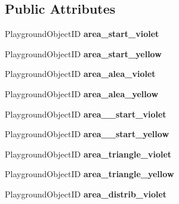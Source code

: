 \subsection*{Public Attributes}
\begin{DoxyCompactItemize}
\item 
\mbox{\label{classLegoEV3IAExtended_a8add6d374fb3263e93fc3a43a46c4d80}} 
Playground\+Object\+ID {\bfseries area\+\_\+start\+\_\+violet}
\item 
\mbox{\label{classLegoEV3IAExtended_a036e8575b6233107715cb855d7fb7c81}} 
Playground\+Object\+ID {\bfseries area\+\_\+start\+\_\+yellow}
\item 
\mbox{\label{classLegoEV3IAExtended_a48a6789221e40b73fb71f272fa65e4b2}} 
Playground\+Object\+ID {\bfseries area\+\_\+alea\+\_\+violet}
\item 
\mbox{\label{classLegoEV3IAExtended_a774320d78385f2360c60a7cbf1289a2e}} 
Playground\+Object\+ID {\bfseries area\+\_\+alea\+\_\+yellow}
\item 
\mbox{\label{classLegoEV3IAExtended_a6e0cd909b2e7839ca99800ecaaa26634}} 
Playground\+Object\+ID {\bfseries area\+\_\+\_\+start\+\_\+violet}
\item 
\mbox{\label{classLegoEV3IAExtended_a8be33a87f780b0b2347a311bd2235757}} 
Playground\+Object\+ID {\bfseries area\+\_\+\_\+start\+\_\+yellow}
\item 
\mbox{\label{classLegoEV3IAExtended_aca9b64539b1fa9c009830cac3ceeab3b}} 
Playground\+Object\+ID {\bfseries area\+\_\+triangle\+\_\+violet}
\item 
\mbox{\label{classLegoEV3IAExtended_a1fbfb6dc0b00fd80ff0ae478c53aabd2}} 
Playground\+Object\+ID {\bfseries area\+\_\+triangle\+\_\+yellow}
\item 
\mbox{\label{classLegoEV3IAExtended_acf309ba7589d6a190511bb8d95c65a25}} 
Playground\+Object\+ID {\bfseries area\+\_\+distrib\+\_\+violet}
\item 

\end{DoxyCompactItemize}
